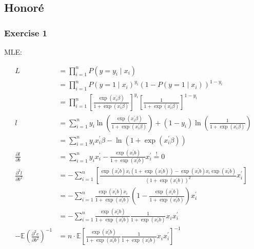 \newpage
{
\subsection*{Honor\'e}

{
\subsubsection*{Exercise 1}

\begin{enumerate}[label=(\arabic*)]
{\item 
 MLE:

$$
\begin{aligned}
L&=\prod_{i=1}^{n} P\left(y=y_{i} \mid x_{i}\right) \\
&=\prod_{i=1}^{n} P\left(y=1 \mid x_{i}\right)^{y_{i}} \left(1-P\left(y=1 \mid x_{i}\right)\right)^{1-y_{i}} \\
&=\prod_{i=1}^{n}\left[\frac{\exp \left(x_{i}^{\prime} \beta\right)}{1+\exp \left(x_{i}^{\prime} \beta\right)}\right]^{y_{i}}\left[\frac{1}{1+\exp \left(x_{i}^{\prime} \beta\right)}\right]^{1-y_{i}} \\
l&=\sum_{i=1}^{n} y_{i} \ln \left(\frac{\exp \left(x_{i}^{\prime} \beta\right)}{1+\exp \left(x_{i}^{\prime} \beta\right)}\right)+\left(1-y_{i}\right) \ln \left(\frac{1}{1+\exp \left(x_{i}^{\prime} \beta\right)}\right) \\
&=\sum_{i=1}^{n} y_{i} x_{i}^{\prime} \beta-\ln \left(1+\exp \left(x_{i}^{\prime} \beta\right)\right) \\
\frac{\partial l}{\partial b} &=\sum_{i=1}^{n} y_{i} x_{i}^{\prime}-\frac{\exp \left(x_{i}^{\prime} b\right)}{1+\exp \left(x_{i}^{\prime} b\right)} x_{i}^{\prime} \stackrel{!}{=} 0 \\
\frac{\partial^{2} l}{\partial b^{2}} &=-\sum_{i=1}^{n}\left[\frac{\exp \left(x_{i}^{\prime} b\right) x_{i}\left(1+\exp \left(x_{i}^{\prime} b\right)\right)-\exp \left(x_{i}^{\prime} b\right) x_{i} \exp \left(x_{i}^{\prime} b\right)}{\left(1+\exp \left(x_{i}^{\prime} b\right)\right)^{2}} x_{i}^{\prime}\right] \\
&=-\sum_{i=1}^{n} \frac{\exp \left(x_{i}^{\prime} b\right) x_{i}}{1+\exp \left(x_{i}^{\prime} b\right)}\left(1-\frac{\exp \left(x_{i}^{\prime} b\right)}{1+\exp \left(x_{i}^{\prime} b\right)}\right) x_{i}^{\prime} \\
&=-\sum_{i=1}^{n} \frac{\exp \left(x_{i}^{\prime} b\right)}{1+\exp \left(x_{i}^{\prime} b\right)} \frac{1}{1+\exp \left(x_{i}^{\prime} b\right)} x_{i} x_{i}^{\prime} \\
-\mathbb{E}\left(\frac{\partial^{2} e}{\partial b^{2}}\right)^{-1}&=n \cdot \mathbb{E}\left[\frac{\exp \left(x_{i}^{\prime} b\right)}{1+\exp \left(x_{i}^{\prime} b\right)} \frac{1}{1+\exp \left(x_{i}^{\prime} b\right)} x_{i} x_{i}^{\prime}\right]^{-1}
\end{aligned}
$$

}
\end{enumerate}}}
